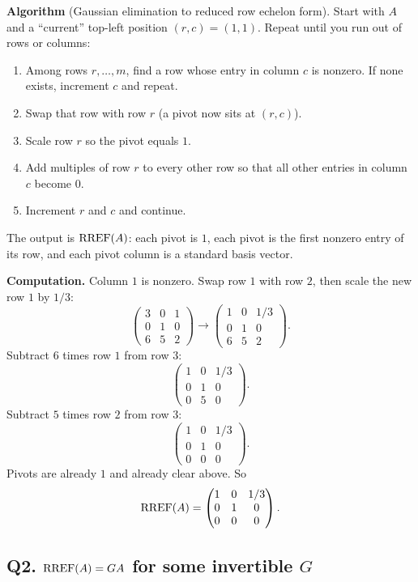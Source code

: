 \begin{coursebox}
\textbf{Algorithm} (Gaussian elimination to reduced row echelon form).
Start with $A$ and a ``current'' top-left position $(r,c)=(1,1)$. Repeat until
you run out of rows or columns:
\begin{enumerate}[leftmargin=1.8em]
\item Among rows $r,\ldots,m$, find a row whose entry in column $c$ is nonzero.
If none exists, increment $c$ and repeat.
\item Swap that row with row $r$ (a pivot now sits at $(r,c)$).
\item Scale row $r$ so the pivot equals $1$.
\item Add multiples of row $r$ to every other row so that all other entries in
column $c$ become $0$.
\item Increment $r$ and $c$ and continue.
\end{enumerate}
The output is $\operatorname{RREF}(A)$: each pivot is $1$, each pivot is the first nonzero
entry of its row, and each pivot column is a standard basis vector.

\textbf{Computation.}
Column $1$ is nonzero. Swap row $1$ with row $2$, then scale the new row $1$ by
$1/3$:
\[
\begin{pmatrix}3&0&1\\0&1&0\\6&5&2\end{pmatrix}
\to
\begin{pmatrix}1&0&1/3\\0&1&0\\6&5&2\end{pmatrix}.
\]
Subtract $6$ times row $1$ from row $3$:
\[
\begin{pmatrix}1&0&1/3\\0&1&0\\0&5&0\end{pmatrix}.
\]
Subtract $5$ times row $2$ from row $3$:
\[
\begin{pmatrix}1&0&1/3\\0&1&0\\0&0&0\end{pmatrix}.
\]
Pivots are already $1$ and already clear above. So
\[
\operatorname{RREF}(A)=\begin{pmatrix}1&0&1/3\\0&1&0\\0&0&0\end{pmatrix}.
\]
\end{coursebox}

\subsection{Q2. $\operatorname{RREF}(A)=GA$ for some invertible $G$}

